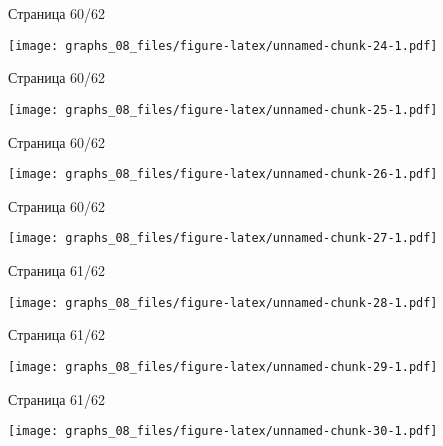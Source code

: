 \documentclass[russian,]{article}
\begin{document}
\newpage
Страница 60/62

\texttt{[image: graphs\_08\_files/figure-latex/unnamed-chunk-24-1.pdf]}

\newpage
Страница 60/62

\texttt{[image: graphs\_08\_files/figure-latex/unnamed-chunk-25-1.pdf]}

\newpage
Страница 60/62

\texttt{[image: graphs\_08\_files/figure-latex/unnamed-chunk-26-1.pdf]}

\newpage
Страница 60/62

\texttt{[image: graphs\_08\_files/figure-latex/unnamed-chunk-27-1.pdf]}

\newpage
Страница 61/62

\texttt{[image: graphs\_08\_files/figure-latex/unnamed-chunk-28-1.pdf]}

\newpage
Страница 61/62

\texttt{[image: graphs\_08\_files/figure-latex/unnamed-chunk-29-1.pdf]}

\newpage
Страница 61/62

\texttt{[image: graphs\_08\_files/figure-latex/unnamed-chunk-30-1.pdf]}
\end{document}
